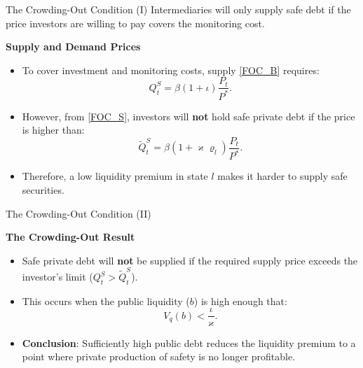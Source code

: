 \documentclass[11pt,aspectratio=169]{beamer}
\begin{document}
\begin{frame}{The Crowding-Out Condition (I)}
\small
Intermediaries will only supply safe debt if the price investors are willing to pay covers the monitoring cost.

\vspace{0.2cm}
\textbf{Supply and Demand Prices}
\begin{itemize}
    \item To cover investment and monitoring costs, supply \eqref{FOC_B} requires:
    \begin{equation}
    Q_{t}^{S}=\beta \left( 1+\iota \right) \frac{P_{t}}{P^{\ast }}.
    \end{equation}
    \item However, from \eqref{FOC_S}, investors will \textbf{not} hold safe private debt if the price is higher than:
    \begin{equation}
    \tilde{Q}_{t}^{S}=\beta \left( 1+\varkappa \varrho _{l}\right) \frac{P_{t}}{P^{\ast }}.
    \end{equation}
\end{itemize}

\vspace{0.2cm}
\begin{itemize}
    \item Therefore, a low liquidity premium in state $l$ makes it harder to supply safe securities.
\end{itemize}
\end{frame}

\begin{frame}{The Crowding-Out Condition (II)}
\small

\vspace{0.4cm}
\textbf{The Crowding-Out Result}
\begin{itemize}
    \item Safe private debt will \textbf{not} be supplied if the required supply price exceeds the investor's limit ($Q_{t}^{S} > \tilde{Q}_{t}^{S}$).
    \item This occurs when the public liquidity ($b$) is high enough that:
    \begin{equation}
    V_{q}(b) < \frac{\iota}{\varkappa}.
    \end{equation}
    \item \textbf{Conclusion}: Sufficiently high public debt reduces the liquidity premium to a point where private production of safety is no longer profitable.
\end{itemize}
\end{frame}
\end{document}
